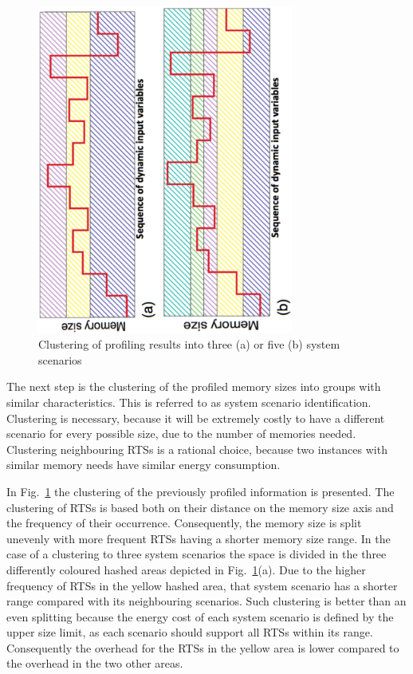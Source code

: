 \documentclass[smallcondensed]{svjour3}
\begin{document}
\begin{figure}
\centering
\includegraphics[angle=270, width=0.75\textwidth]{Images/1Dclustering.ps}
\caption{Clustering of profiling results into three (a) or five (b) system scenarios}
\label{fig:clustering}
\end{figure}

The next step is the clustering of the profiled memory sizes into groups with similar characteristics. 
This is referred to as system scenario identification. 
Clustering is necessary, because it will be extremely costly to have a different scenario for every possible size, due to the number of memories needed. 
Clustering neighbouring RTSs is a rational choice, because two instances with similar memory needs have similar energy consumption. 

In Fig.~\ref{fig:clustering} the clustering of the previously profiled information is presented. 
The clustering of RTSs is based both on their distance on the memory size axis and the frequency of their occurrence. 
Consequently, the memory size is split unevenly with more frequent RTSs having a shorter memory size range. 
In the case of a clustering to three system scenarios the space is divided in the three differently coloured hashed areas depicted in Fig.~\ref{fig:clustering}(a). 
Due to the higher frequency of RTSs in the yellow hashed area, that system scenario has a shorter range compared with its neighbouring scenarios. 
Such clustering is better than an even splitting because the energy cost of each system scenario is defined by the upper size limit, as each scenario should support all RTSs within its range. 
Consequently the overhead for the RTSs in the yellow area is lower compared to the overhead in the two other areas.
\end{document}
